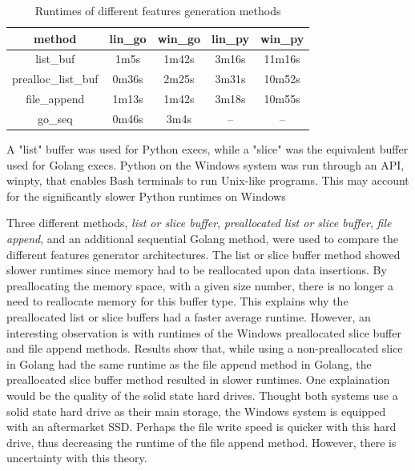 \begin{table}[h!]
    \centering
    \begin{tabular}{ |c|c|c|c|c| }
        \hline
        \textbf{method} & \textbf{lin{\_}go} & \textbf{win{\_}go} & \textbf{lin{\_}py} & \textbf{win{\_}py} \\
        \hline
        list{\_}buf & 1m5s & 1m42s & 3m16s & 11m16s \\
        prealloc{\_}list{\_}buf & 0m36s & 2m25s & 3m31s & 10m52s \\
        file{\_}append & 1m13s & 1m42s & 3m18s & 10m55s \\
        go{\_}seq & 0m46s & 3m4s & -- & -- \\
        \hline
    \end{tabular}
    \caption{Runtimes of different features generation methods}
    {\small A "list" buffer was used for Python execs, while a "slice" was the equivalent buffer used for Golang execs. Python on the Windows system was run through an API, winpty, that enables Bash terminals to run Unix-like programs. This may account for the significantly slower Python runtimes on Windows}
\end{table}

Three different methods, \textit{list or slice buffer}, \textit{preallocated list or slice buffer}, \textit{file append}, and an additional sequential Golang method, were used to compare the different features generator architectures. The list or slice buffer method showed slower runtimes since memory had to be reallocated upon data insertions. By preallocating the memory space, with a given size number, there is no longer a need to reallocate memory for this buffer type. This explains why the preallocated list or slice buffers had a faster average runtime. However, an interesting observation is with runtimes of the Windows preallocated slice buffer and file append methods. Results show that, while using a non-preallocated slice in Golang had the same runtime as the file append method in Golang, the preallocated slice buffer method resulted in slower runtimes. One explaination would be the quality of the solid state hard drives. Thought both systems use a solid state hard drive as their main storage, the Windows system is equipped with an aftermarket SSD. Perhaps the file write speed is quicker with this hard drive, thus decreasing the runtime of the file append method. However, there is uncertainty with this theory.

